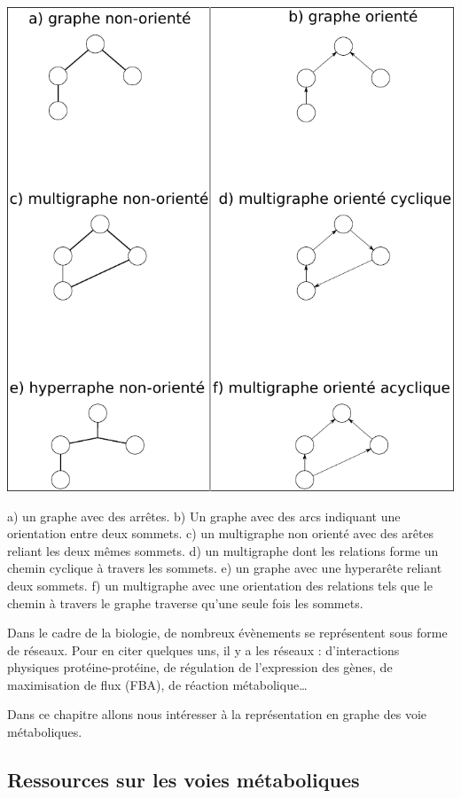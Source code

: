 \begin{refsegment}
    
    \begin{shadedfigure}
    	\centering
    	\includegraphics[width=\textwidth]{img/graph.pdf}
    	\caption{a) un graphe  avec des arrêtes. b) Un graphe avec des arcs indiquant une orientation entre deux sommets. c) un multigraphe non orienté avec des arêtes reliant les deux mêmes sommets. d) un multigraphe dont les relations forme un chemin cyclique à travers les sommets. e) un graphe avec une hyperarête reliant deux sommets. f) un multigraphe avec une orientation des relations tels que le chemin à travers le graphe traverse qu'une seule fois les sommets. }
    	\label{fig:graphe}
    \end{shadedfigure}
    
    
    
    Dans le cadre de la biologie, de nombreux évènements se représentent sous forme de réseaux. Pour en citer quelques uns, il y a les réseaux : d'interactions physiques protéine-protéine, de régulation de l'expression des gènes, de maximisation de flux (\gls{FBA}), de réaction métabolique… 
    
    Dans ce chapitre allons nous intéresser à la représentation en graphe des voie métaboliques. 
    
    \subsection{Ressources sur les voies métaboliques}
    

\end{refsegment}
